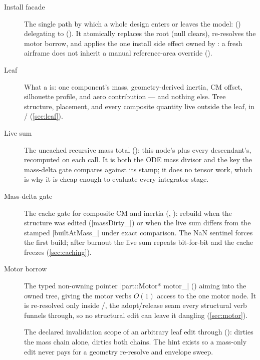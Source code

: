 \begin{description}
\item[Install facade] The single path by which a whole design enters or leaves the model:
   () delegating to
   (). It atomically
  replaces the root (null clears), re-resolves the motor borrow, and applies the one
  install side effect owned by : a fresh airframe does not inherit a
  manual reference-area override ().

\item[Leaf] What a  is: one component's mass, geometry-derived inertia, CM
  offset, silhouette profile, and aero contribution --- and nothing else. Tree
  structure, placement, and every composite quantity live outside the leaf, in
  / (\cref{sec:leaf}).

\item[Live sum] The uncached recursive mass total
   (): this node's
   plus every descendant's, recomputed on each call. It is both the ODE
  mass divisor and the key the mass-delta gate compares against its stamp; it does no
  tensor work, which is why it is cheap enough to evaluate every integrator stage.

\item[Mass-delta gate] The cache gate for composite CM and inertia
  (, ): rebuild
  when the structure was edited (\cppinline|massDirty_|) or when the live sum differs
  from the stamped \cppinline|builtAtMass_| under exact \code{==} comparison. The NaN
  sentinel forces the first build; after burnout the live sum repeats bit-for-bit and
  the cache freezes (\cref{sec:caching}).

\item[Motor borrow] The typed non-owning pointer \cppinline|part::Motor* motor_|
  () aiming into the owned tree, giving the motor
  verbs $O(1)$ access to the one motor node. It is re-resolved only inside
  /, the adopt/release seam every
  structural verb funnels through, so no structural edit can leave it dangling
  (\cref{sec:motor}).

\item[] The declared invalidation scope of an arbitrary leaf edit
  through  (): 
  dirties the mass chain alone,  dirties both chains. The hint exists so
  a mass-only edit never pays for a geometry re-resolve and envelope sweep.


\end{description}

